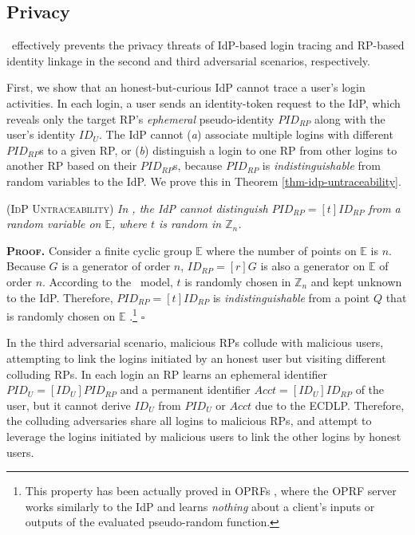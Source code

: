 
\subsection{Privacy}
\label{sec-:analysis}
\usso\ effectively prevents the privacy threats of IdP-based login tracing and RP-based identity linkage in the second and third adversarial scenarios, respectively.

\newc
First, we show that an honest-but-curious IdP cannot trace a user's login activities. In each login, a user sends an identity-token request to the IdP, %
which reveals only the target RP's \emph{ephemeral} pseudo-identity $PID_{RP}$ along with the user's identity $ID_U$.
The IdP cannot (\emph{a}) associate multiple logins with different $PID_{RP}$s to a given RP, or (\emph{b}) distinguish a login to one RP from other logins to another RP based on their $PID_{RP}$s, because $PID_{RP}$ is \emph{indistinguishable} from random variables to the IdP.
We prove this in Theorem \ref{thm-idp-untraceability}.

\begin{thm}
\textsc{(IdP Untraceability)} \emph{In \usso, the IdP cannot distinguish $PID_{RP} = [t]ID_{RP}$ from a random variable on $\mathbb{E}$, where $t$ is random in $\mathbb{Z}_n$.}
\label{thm-idp-untraceability}
\end{thm}

\noindent\textbf{\textsc{Proof.}}
Consider a finite cyclic group $\mathbb{E}$ where the number of points on $\mathbb{E}$ is $n$.
Because $G$ is a generator of order $n$, $ID_{RP} = [r]G$ is also a generator on $\mathbb{E}$ of order $n$. According to the \dyu\ model, $t$ is randomly chosen in $\mathbb{Z}_n$ and kept unknown to the IdP. Therefore, $PID_{RP} = [t]ID_{RP}$ is \emph{indistinguishable} from a point $Q$ that is randomly chosen on $\mathbb{E}$ \cite{oprf-proved,voprf-proved}.\footnote{\newc This property has been actually proved in OPRFs \cite{oprf-proved,voprf-proved}, where the OPRF server works similarly to the IdP and learns \emph{nothing} about a client's inputs or outputs of the evaluated pseudo-random function.} \hfill $\square$


\vspace{2mm}

In the third adversarial scenario, malicious RPs collude with malicious users,
 attempting to link the logins initiated by an honest user but visiting different colluding RPs.
In each login an RP learns an ephemeral identifier $PID_{U} = [{ID_U}]{PID_{RP}}$ and a permanent identifier $Acct = [ID_U]ID_{RP}$ of the user, but it cannot derive $ID_U$ from $PID_{U}$ or $Acct$ due to the ECDLP.
Therefore, the colluding adversaries share all logins to malicious RPs,
    and attempt to leverage the logins initiated by malicious users to link the other logins by honest users.



